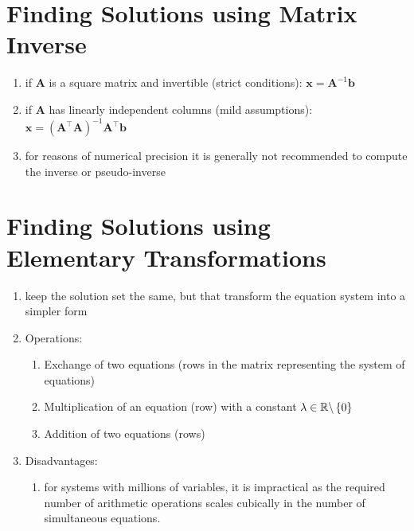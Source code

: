 \section{Finding Solutions using Matrix Inverse}

\begin{enumerate}
    \item if $\bm{A}$ is a square matrix and invertible (strict conditions): $\bm{x} = \bm{A}^{-1}\bm{b}$
    \hfill \cite{mfml/book/mml/Deisenroth-Faisal-Ong}

    \item if $\bm{A}$ has linearly independent columns (mild assumptions): $\bm{x} = (\bm{A}^\top  \bm{A})^{-1}\bm{A}^\top \bm{b}$
    \hfill \cite{mfml/book/mml/Deisenroth-Faisal-Ong}

    \item for reasons of numerical precision it is generally not recommended to compute the inverse or pseudo-inverse
    \hfill \cite{mfml/book/mml/Deisenroth-Faisal-Ong}
\end{enumerate}


\section{Finding Solutions using Elementary Transformations}

\begin{enumerate}
    \item keep the solution set the same, but that transform the equation system into a simpler form
    \hfill \cite{mfml/book/mml/Deisenroth-Faisal-Ong}

    \item Operations:
    \begin{enumerate}
        \item Exchange of two equations (rows in the matrix representing the system of equations)
        \hfill \cite{mfml/book/mml/Deisenroth-Faisal-Ong}

        \item Multiplication of an equation (row) with a constant $\lambda \in \mathbb{R} \backslash \left\{0\right\}$
        \hfill \cite{mfml/book/mml/Deisenroth-Faisal-Ong}

        \item Addition of two equations (rows) 
        \hfill \cite{mfml/book/mml/Deisenroth-Faisal-Ong}
    \end{enumerate}

    \item Disadvantages:
    \begin{enumerate}
        \item for systems with millions of variables, it is impractical as the required number of arithmetic operations scales cubically in the number of simultaneous equations.
        \hfill \cite{mfml/book/mml/Deisenroth-Faisal-Ong}
    \end{enumerate}
\end{enumerate}



